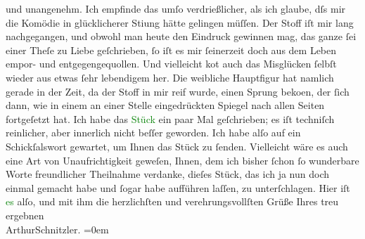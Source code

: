                     und unangenehm. Ich empfinde das umſo verdrießlicher, als ich glaube, dſs mir
                    die Komödie in glücklicherer Sti{\geminationm}ung hätte gelingen
                    müſſen. {\pb}Der Stoff iſt mir lang
                    nachgegangen, und obwohl man heute den Eindruck gewinnen mag, das ganze ſei
                    einer Theſe zu Liebe geſchrieben, ſo iſt es mir ſeinerzeit doch aus dem Leben
                    empor- und entgegengequollen. Und vielleicht ko{\geminationm}t
                    auch das Misglücken ſelbſt wieder aus etwas ſehr lebendigem {\pb}her. Die weibliche Hauptfigur hat
                    namlich gerade in der Zeit, da der Stoff in mir reif wurde, einen Sprung beko{\geminationm}en, der ſich dann, wie in einem an einer Stelle
                    eingedrückten Spiegel nach allen Seiten fortgeſetzt hat. Ich habe das \textcolor{green}{Stück}{} ein paar Mal geſchrieben; es iſt
                    techniſch reinlicher, aber innerlich {\pb}nicht beſſer geworden. Ich habe alſo auf ein Schickſalswort gewartet, um Ihnen
                    das Stück zu ſenden. Vielleicht wäre es auch eine Art von Unaufrichtigkeit
                    geweſen, Ihnen, dem ich bisher ſchon ſo wunderbare Worte freundlicher Theilnahme
                    verdanke, dieſes Stück, das ich ja nun doch einmal {\pb}gemacht habe und ſogar habe aufführen
                    laſſen, zu unterſchlagen.\pend
           \pstart
           Hier iſt \textcolor{green}{es}{} alſo, und mit ihm die
                    herzlichſten und verehrungsvollſten Grüße Ihres treu ergebnen{\\[\baselineskip]}\spacefill\mbox{ArthurSchnitzler.}\pend
           \leftskip=0em{}\endnumbering{}  
      